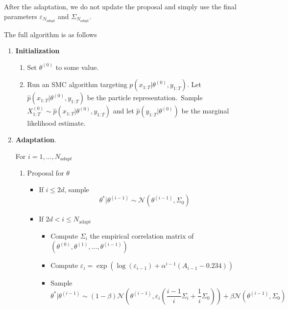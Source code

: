 \documentclass{article}%
\begin{document}
After the adaptation, we do not update the proposal and simply use the final
parameters $\varepsilon_{N_{adapt}}$ and $\Sigma_{N_{adapt}}.$

\bigskip

The full algorithm is as follows

\begin{enumerate}
\item \textbf{Initialization}

\begin{enumerate}
\item Set $\theta^{(0)}$ to some value.

\item Run an SMC algorithm targeting $p(x_{1:T}|\theta^{(0)},y_{1:T})$. Let
$\widehat{p}(x_{1:T}|\theta^{(0)},y_{1:T})$ be the particle
representation.\ Sample $X_{1:T}^{(0)}\sim\widehat{p}(x_{1:T}|\theta
^{(0)},y_{1:T})$ and let $\widehat{p}(y_{1:T}|\theta^{(0)})$ be the marginal
likelihood estimate.
\end{enumerate}

\item \textbf{Adaptation}.

For $i=1,\ldots,N_{adapt}$

\begin{enumerate}
\item Proposal for $\theta$

\begin{itemize}
\item If $i\leq2d$, sample
\[
\theta^{\ast}|\theta^{(i-1)}\sim\mathcal{N}\left(  \theta^{(i-1)},\Sigma
_{0}\right)
\]


\item If $2d<i\leq N_{\text{adapt}}$

\begin{itemize}
\item Compute $\Sigma_{i}$ the empirical correlation matrix of $(\theta
^{(0)},\theta^{(1)},\ldots,\theta^{(i-1)})$

\item Compute $\varepsilon_{i}=\exp(\log(\varepsilon_{i-1})+\alpha
^{i-1}(A_{i-1}-0.234))$

\item Sample
\[
\theta^{\ast}|\theta^{(i-1)}\sim(1-\beta)\mathcal{N}\left(  \theta
^{(i-1)},\varepsilon_{i}\left(  \frac{i-1}{i}\Sigma_{i}+\frac{1}{i}\Sigma
_{0}\right)  \right)  +\beta\mathcal{N}\left(  \theta^{(i-1)},\Sigma
_{0}\right)
\]

\end{itemize}
\end{itemize}


\end{enumerate}
\end{enumerate}
\end{document}
